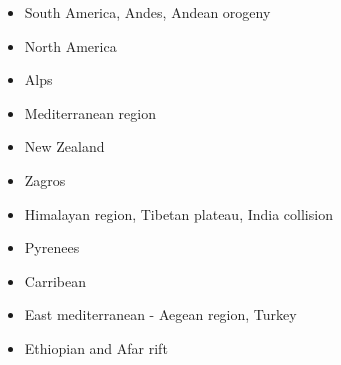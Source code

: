 \begin{itemize}
\item South America, Andes, Andean orogeny 
\cite{wdbo94b}
\cite{baso05}\cite{soba05}
\cite{basv06}
\cite{hucf12}
\cite{robn16}
\item North America 
\cite{huha90}
\cite{bugm97}
\cite{besb06}
\cite{splg08}
\cite{splg09}
\cite{ghbh13}
\item Alps 
\cite{pfsb02}
\cite{pimo03}
\cite{buge05}
\cite{vifj08}
\cite{luws13}
\cite{scdu15}
\item Mediterranean region 
\cite{pimo97}
\cite{pimo03}
\cite{bofb10}\cite{fabe10}
\cite{chsv14}\cite{chsg14}
\cite{spcv18}
\item {New Zealand} 
\cite{koon90}
\cite{brbe95}
\cite{bekh96}
\cite{babr99}
\cite{gedh02}\cite{pybf02}
\cite{gehd03}\cite{konc03}\cite{upke03}
\cite{libi06}
\cite{pyeg10}\cite{spgs10a}
\cite{grel12}
\item {Zagros}
\cite{vech06}
\cite{hamo10}
\cite{yakm11}
\cite{nipc13}
\cite{frba14}
\cite{ghbu14}
\cite{coyc16}
\cite{rugb17}
\item {Himalayan region, Tibetan plateau, India collision} 
\cite{bird78}
\cite{tapl82}\cite{vidm82}
\cite{vidm84}
\cite{vimd86}
\cite{peta88}
\cite{moln89}
\cite{moem93}
\cite{wibe94}
\cite{chmm95}\cite{leka95}
\cite{robk97}
\cite{vasb99}
\cite{cblk00}\cite{clro00}
\cite{bejn01}\cite{laav01}\cite{zemk01}\cite{tazr01}
\cite{kozc02}
\cite{reta03}
\cite{bejn04}
\cite{clbr05}\cite{rost05a}\cite{rost05b}
\cite{clrw06}
\cite{busc08}
\cite{hamo10}
\cite{befa11}\cite{zhxy11}
\cite{zams12}
\cite{care13}\cite{mutg13}\cite{chgz13}\cite{chgz13b}
\cite{whbb14}
\cite{bube17}
\cite{pirf18}
\cite{sccs19}\cite{scvm19}
\item {Pyrenees} 
\cite{giju98}
\cite{bemh00}
\cite{mcmg04}
\cite{jaml10}
\cite{vime12}
\cite{fihv13b}
\cite{dual19}
\item{Carribean} 
\item{East mediterranean - Aegean region, Turkey} 
\cite{cazf10}
\item{Ethiopian and Afar rift} 

\end{itemize}
